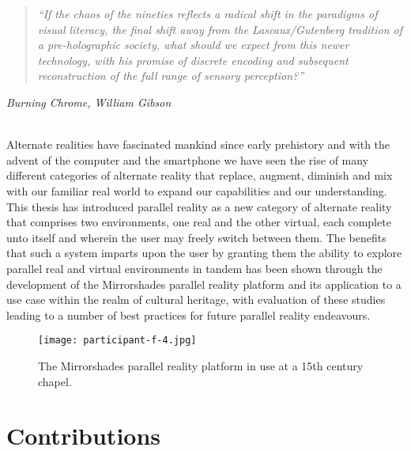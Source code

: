 \begin{quote}
	\textit{``If the chaos of the nineties reflects a radical shift in the paradigms of visual literacy, the final shift away from the Lascaux/Gutenberg tradition of a pre-holographic society, what should we expect from this newer technology, with his promise of discrete encoding and subsequent reconstruction of the full range of sensory perception?''}
\end{quote}
\hfill \textit{Burning Chrome, William Gibson}
\\
\\


\label{chapter-conclusions}

Alternate realities have fascinated mankind since early prehistory and with the advent of the computer and the smartphone we have seen the rise of many different categories of alternate reality that replace, augment, diminish and mix with our familiar real world to expand our capabilities and our understanding. This thesis has introduced parallel reality as a new category of alternate reality that comprises two environments, one real and the other virtual, each complete unto itself and wherein the user may freely switch between them. The benefits that such a system imparts upon the user by granting them the ability to explore parallel real and virtual environments in tandem has been shown through the development of the Mirrorshades parallel reality platform and its application to a use case within the realm of cultural heritage, with evaluation of these studies leading to a number of best practices for future parallel reality endeavours.

\begin{figure}[h]
	\begin{center}
		\texttt{[image: participant-f-4.jpg]}
		\caption{The Mirrorshades parallel reality platform in use at a 15th century chapel.}
		\label{participant-f-4.jpg}
	\end{center}	
\end{figure}


\section{Contributions}

